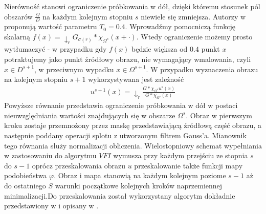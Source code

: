 \documentclass[12pt, twoside, openany]{report}
\theoremstyle{definition}
\begin{document}
Nierówność stanowi ograniczenie próbkowania w dół, dzięki któremu stosunek pól obszarów $\frac{\Omega}{D}$ na każdym kolejnym stopniu $s$ niewiele się zmniejsza. Autorzy w \cite{arias2011variational} proponują wartość parametru $T_0=0.4$. Wprowadźmy pomocniczą funkcję skalarną $f(x) = \downarrow_r G_{\sigma(r)}\ast\chi_{\Omega^s}(x + \cdot)$. Wtedy ograniczenie możemy prosto wytłumaczyć - w przypadku gdy $f(x)$ będzie większa od $0.4$ punkt $x$ potraktujemy jako punkt źródłowy obrazu, nie wymagający wmalowania, czyli $x \in D^{s+1}$, w przeciwnym wypadku $x \in \Omega^{s+1}.$ W przypadku wyznaczenia obrazu na kolejnym stopniu $s+1$ wykorzystywana jest zależność
\begin{align}
u^{s+1}(x)= \downarrow_r \frac{G \ast \chi_{\Omega^s} u^s(x)}{G \ast \chi_{\Omega^s}(x)}
\end{align}
Powyższe równanie przedstawia ograniczenie próbkowania w dół w postaci nieuwzględniania wartości znajdujących się w obszarze $\Omega^s$. Obraz w pierwszym kroku zostaje przemnożony przez maskę przedstawiającą źródłową część obrazu, a następnie poddany operacji splotu z utworzonym filtrem Gauss'a. Mianownik tego równania służy normalizacji obliczenia. Wielostopniowy schemat wypełniania w zastosowaniu do algorytmu $VFI$ wymusza przy każdym przejściu ze stopnia $s$ do $s-1$ oprócz przeskalowania obrazu $u$ przeskalowanie także funkcji mapy podobieństwa $\varphi$. Obraz i mapa stanowią na każdym kolejnym poziome $s-1$ aż do ostatniego $S$ warunki początkowe kolejnych kroków naprzemiennej minimalizacji.Do przeskalowania  został wykorzystany algorytm dokładnie przedstawiony w \cite{wexler2007space} i opisany w \cite{arias2011variational}.
\end{document}
